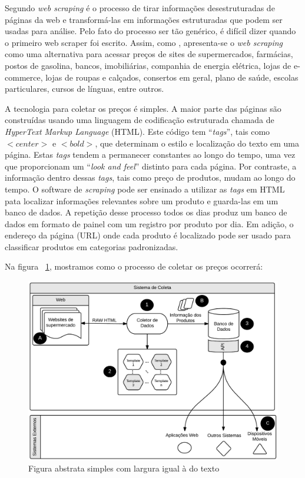 \documentclass[twoside,a4paper,12pt]{report}
\begin{document}
Segundo \citet{manning2008introduction} \emph{web scraping} é o processo de tirar informações desestruturadas de páginas da web e transformá-las em informações estruturadas que podem ser usadas para análise.  Pelo fato do processo ser tão genérico, é difícil dizer quando o primeiro web scraper foi escrito. Assim, como \citet{cavallo2010scraped}, apresenta-se o \emph{web scraping} como uma alternativa para acessar preços de sites de supermercados, farmácias, postos de gasolina, bancos, imobiliárias, companhia de energia elétrica, lojas de e-commerce, lojas de roupas e calçados, consertos em geral, plano de saúde, escolas particulares, cursos de línguas, entre outros. 

A tecnologia para coletar os preços é simples. A maior parte das páginas são construídas usando uma linguagem de codificação estruturada chamada de \emph{HyperText Markup Language} (HTML). Este código tem “\emph{tags}”, tais como $<center>$ e $<bold>$, que determinam o estilo e localização do texto em uma página. Estas \emph{tags} tendem a permanecer constantes ao longo do tempo, uma vez que proporcionam um “\emph{look and feel}” distinto para cada página. Por contraste, a informação dentro dessas \emph{tags}, tais como preço de produtos, mudam ao longo do tempo. O software de \emph{scraping} pode ser ensinado a utilizar as \emph{tags} em HTML pata localizar informações relevantes sobre um produto e guarda-las em um banco de dados. A repetição desse processo todos os dias produz um banco de dados em formato de painel com um registro por produto por dia. Em adição, o endereço da página (URL) onde cada produto é localizado pode ser usado para classificar produtos em categorias padronizadas. 

Na figura ~\ref{fig:01}, mostramos como o processo de coletar os preços ocorrerá:

\begin{figure}[htbp]
  \centering
  \includegraphics[width=\textwidth]{WebScraping}
  \caption[Figura Simples]{Figura abstrata simples com largura igual à do texto}
  \label{fig:01}
\end{figure}
\end{document}
